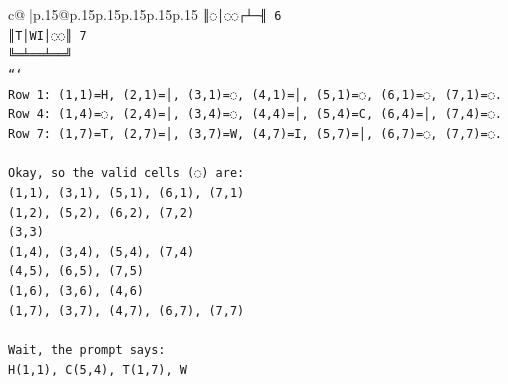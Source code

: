 \documentclass{article}
\begin{document}
{\begin{supertabular}{c@{$\;$}|p{.15\linewidth}@{}p{.15\linewidth}p{.15\linewidth}p{.15\linewidth}p{.15\linewidth}p{.15\linewidth}}
{{{\texttt{║◌│◌◌┌┴─╢ 6} \\
\texttt{║T│WI│◌◌║ 7} \\
\texttt{╚═╧══╧══╝} \\
\texttt{```} \\
\texttt{Row 1: (1,1)=H, (2,1)=│, (3,1)=◌, (4,1)=│, (5,1)=◌, (6,1)=◌, (7,1)=◌.} \\
\texttt{Row 4: (1,4)=◌, (2,4)=│, (3,4)=◌, (4,4)=│, (5,4)=C, (6,4)=│, (7,4)=◌.} \\
\texttt{Row 7: (1,7)=T, (2,7)=│, (3,7)=W, (4,7)=I, (5,7)=│, (6,7)=◌, (7,7)=◌.} \\
\\ 
\texttt{Okay, so the valid cells (◌) are:} \\
\texttt{(1,1), (3,1), (5,1), (6,1), (7,1)} \\
\texttt{(1,2), (5,2), (6,2), (7,2)} \\
\texttt{(3,3)} \\
\texttt{(1,4), (3,4), (5,4), (7,4)} \\
\texttt{(4,5), (6,5), (7,5)} \\
\texttt{(1,6), (3,6), (4,6)} \\
\texttt{(1,7), (3,7), (4,7), (6,7), (7,7)} \\
\\ 
\texttt{Wait, the prompt says:} \\
\texttt{H(1,1), C(5,4), T(1,7), W} \\
            }
        }
    }
     \\ \\


\end{supertabular}}
\end{document}
